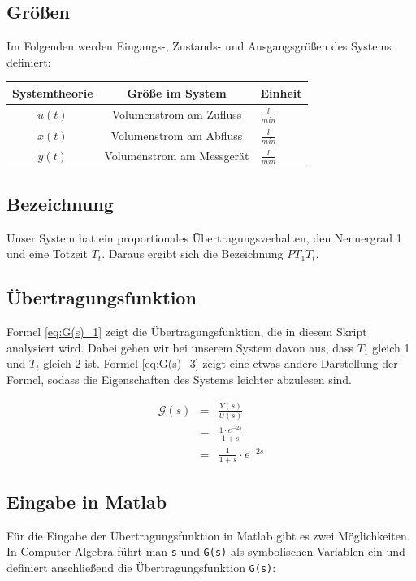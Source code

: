 \subsection{Größen}
Im Folgenden werden Eingangs-, Zustands- und Ausgangsgrößen des Systems definiert:
\renewcommand{\arraystretch}{1.5}
\begin{center}
    \begin{tabular}{ c|c|l } 
    Systemtheorie  & Größe im System & Einheit \\
    \hline
    $u(t)$ & Volumenstrom am Zufluss & $\frac{l}{min}$ \\ 
    $x(t)$ & Volumenstrom am Abfluss &  $\frac{l}{min}$\\ 
    $y(t)$ & Volumenstrom am Messgerät & $\frac{l}{min}$ \\ 
    \end{tabular}
\end{center}


\subsection{Bezeichnung}
Unser System hat ein proportionales Übertragungsverhalten, den Nennergrad 1 und eine Totzeit $T_t$. Daraus ergibt sich die Bezeichnung $PT_{1}T_{t}$.

\subsection{Übertragungsfunktion}

Formel \ref{eq:G(s)_1} zeigt die Übertragungsfunktion, die in diesem Skript analysiert wird. Dabei gehen wir bei unserem System davon aus, dass $T_1$ gleich 1 und $T_t$ gleich 2 ist. Formel \ref{eq:G(s)_3} zeigt eine etwas andere Darstellung der Formel, sodass die Eigenschaften des Systems leichter abzulesen sind.

\begin{eqnarray}
    \label{eq:G(s)_1}
    \mathcal{G}(s) &=& \frac{Y(s)}{U(s)} \\
    \label{eq:G(s)_2}
    &=& \frac{1 \cdot e^{-2s}}{1+s} \\
    \label{eq:G(s)_3}
    &=& \frac{1}{1 + s} \cdot e^{-2s}
\end{eqnarray}

\subsection{Eingabe in Matlab}
Für die Eingabe der Übertragungsfunktion in Matlab gibt es zwei Möglichkeiten. \\
In Computer-Algebra führt man \texttt{s} und \texttt{G(s)} als symbolischen Variablen ein und definiert anschließend die Übertragungsfunktion \texttt{G(s)}:

